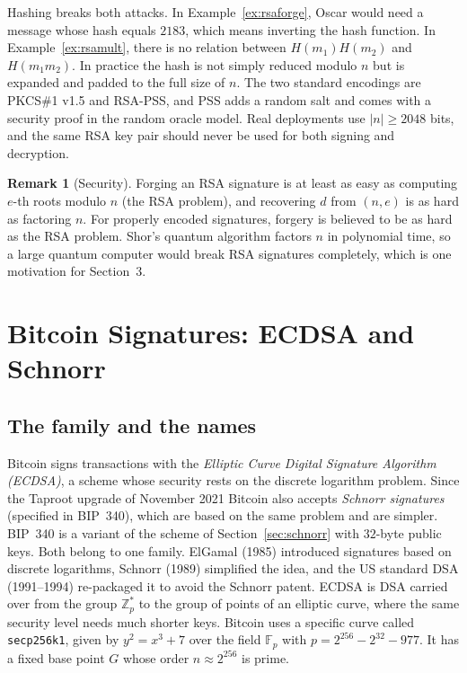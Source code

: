 \documentclass[11pt,a4paper]{article}
\theoremstyle{definition}
\newtheorem{remark}[definition]{Remark}
\newcommand{\Z}{\mathbb{Z}}
\newcommand{\F}{\mathbb{F}}
\newcommand{\Hash}{H}
\begin{document}
Hashing breaks both attacks. In Example~\ref{ex:rsaforge}, Oscar would need a message whose hash equals $2183$, which means inverting the hash function. In Example~\ref{ex:rsamult}, there is no relation between $\Hash(m_1)\Hash(m_2)$ and $\Hash(m_1m_2)$. In practice the hash is not simply reduced modulo $n$ but is expanded and padded to the full size of $n$. The two standard encodings are PKCS\#1 v1.5 and RSA-PSS, and PSS adds a random salt and comes with a security proof in the random oracle model. Real deployments use $|n|\ge 2048$ bits, and the same RSA key pair should never be used for both signing and decryption.

\begin{remark}[Security]
Forging an RSA signature is at least as easy as computing $e$-th roots modulo $n$ (the RSA problem), and recovering $d$ from $(n,e)$ is as hard as factoring $n$. For properly encoded signatures, forgery is believed to be as hard as the RSA problem. Shor's quantum algorithm factors $n$ in polynomial time, so a large quantum computer would break RSA signatures completely, which is one motivation for Section~3.
\end{remark}

\section{Bitcoin Signatures: ECDSA and Schnorr}

\subsection{The family and the names}

Bitcoin signs transactions with the \emph{Elliptic Curve Digital Signature Algorithm (ECDSA)}, a scheme whose security rests on the discrete logarithm problem. Since the Taproot upgrade of November 2021 Bitcoin also accepts \emph{Schnorr signatures} (specified in BIP~340), which are based on the same problem and are simpler. BIP~340 is a variant of the scheme of Section~\ref{sec:schnorr} with $32$-byte public keys. Both belong to one family. ElGamal (1985) introduced signatures based on discrete logarithms, Schnorr (1989) simplified the idea, and the US standard DSA (1991--1994) re-packaged it to avoid the Schnorr patent. ECDSA is DSA carried over from the group $\Z_p^*$ to the group of points of an elliptic curve, where the same security level needs much shorter keys. Bitcoin uses a specific curve called \texttt{secp256k1}, given by $y^2=x^3+7$ over the field $\F_p$ with $p = 2^{256}-2^{32}-977$. It has a fixed base point $G$ whose order $n \approx 2^{256}$ is prime.
\end{document}
